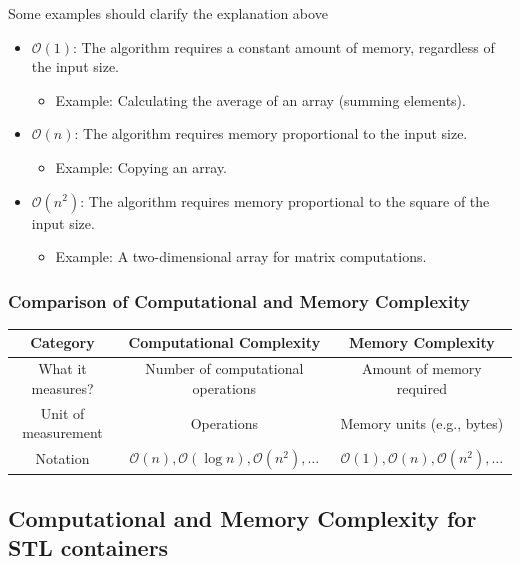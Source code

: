 \documentclass[../main]{subfiles}
\begin{document}
Some examples should clarify the explanation above
\begin{itemize}
    \item \(\mathcal{O}(1)\): The algorithm requires a constant amount of memory, regardless of the input size.
    \begin{itemize}
        \item Example: Calculating the average of an array (summing elements).
    \end{itemize}
    \item \(\mathcal{O}(n)\): The algorithm requires memory proportional to the input size.
    \begin{itemize}
        \item Example: Copying an array.
    \end{itemize}
    \item \(\mathcal{O}(n^2)\): The algorithm requires memory proportional to the square of the input size.
    \begin{itemize}
        \item Example: A two-dimensional array for matrix computations.
    \end{itemize}
\end{itemize}

\pagebreak 

\subsubsection{Comparison of Computational and Memory Complexity}
\begin{table}[h!]
    \centering
    \begin{tabular}{|c|c|c|}
        \hline
        \textbf{Category} & \textbf{Computational Complexity} & \textbf{Memory Complexity} \\
        \hline
        What it measures? & Number of computational operations & Amount of memory required \\
        \hline
        Unit of measurement & Operations & Memory units (e.g., bytes) \\
        \hline
        Notation & \(\mathcal{O}(n), \mathcal{O}(\log n), \mathcal{O}(n^2), \ldots\) & \(\mathcal{O}(1), \mathcal{O}(n), \mathcal{O}(n^2), \ldots\) \\
        \hline
    \end{tabular}
\end{table}

\subsection{Computational and Memory Complexity for STL containers}
\end{document}
